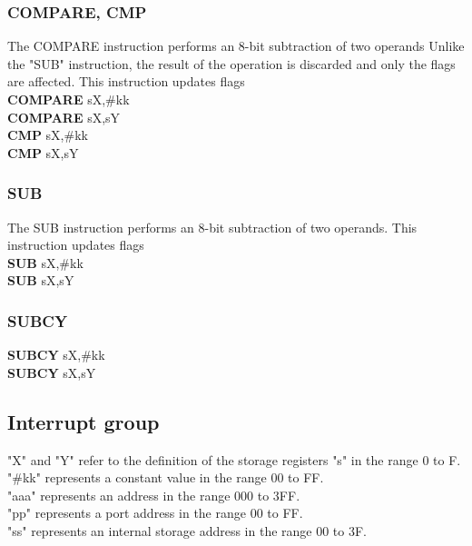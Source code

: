                         \subsubsection{COMPARE, CMP}
                        The COMPARE instruction performs an 8-bit subtraction of two operands Unlike the "SUB" instruction, the result of the operation is
                        discarded and only the flags are affected. This instruction updates flags\\
                            \textbf{COMPARE} sX,\#kk\\
                            \textbf{COMPARE} sX,sY\\
                            \textbf{CMP}     sX,\#kk\\
                            \textbf{CMP}     sX,sY\\

                        \subsubsection{SUB}
                        The SUB instruction performs an 8-bit subtraction of two operands. This instruction updates flags\\
                            \textbf{SUB} sX,\#kk\\
                            \textbf{SUB} sX,sY\\
                        \subsubsection{SUBCY}
                            \textbf{SUBCY} sX,\#kk\\
                            \textbf{SUBCY} sX,sY\\

                \subsection{Interrupt group}
                "X" and "Y" refer to the definition of the storage registers "s" in the range 0 to F.\\
                "\#kk" represents a constant value in the range 00 to FF.\\
                "aaa" represents an address in the range 000 to 3FF.\\
                "pp" represents a port address in the range 00 to FF.\\
                "ss" represents an internal storage address in the range 00 to 3F.\\
